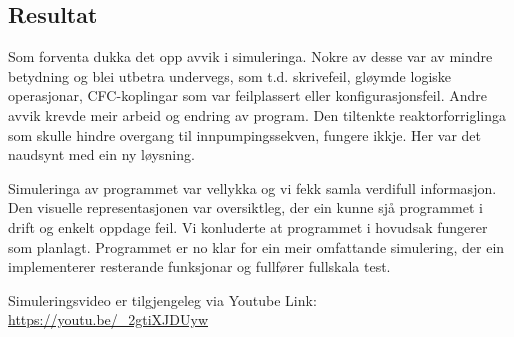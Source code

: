 \newpage

\subsection{Resultat}

Som forventa dukka det opp avvik i simuleringa.
Nokre av desse var av mindre betydning og blei utbetra undervegs, som t.d. skrivefeil, gløymde logiske operasjonar,
\gls{CFC}-koplingar som var feilplassert eller konfigurasjonsfeil. \newline
Andre avvik krevde meir arbeid og endring av program.
Den tiltenkte reaktorforriglinga som skulle hindre overgang til innpumpingssekven, fungere ikkje.
Her var det naudsynt med ein ny løysning.

Simuleringa av programmet var vellykka og vi fekk samla verdifull informasjon. 
Den visuelle representasjonen var oversiktleg, der ein kunne sjå programmet i drift og enkelt oppdage feil. \newline
Vi konluderte at programmet i hovudsak fungerer som planlagt.
Programmet er no klar for ein meir omfattande simulering, der ein implementerer resterande funksjonar og fullfører fullskala test.

Simuleringsvideo er tilgjengeleg via Youtube \newline
Link: \url{https://youtu.be/_2gtiXJDUyw}






